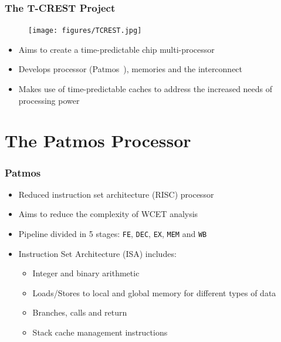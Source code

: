 \documentclass[notheorems]{beamer}
\begin{document}
\begin{frame}
\frametitle{The T-CREST Project}

		\begin{figure}
			\texttt{[image: figures/TCREST.jpg]}
		\end{figure}

\begin{itemize}
	\item Aims to create a time-predictable chip multi-processor
	\item Develops processor (Patmos~\cite{patmos:ppes2011}), memories and the interconnect
	\item Makes use of time-predictable caches to address the increased needs of processing power
\end{itemize}
\end{frame}

\section{The Patmos Processor}
\begin{frame}
\frametitle{Patmos}

\begin{itemize}
	\item Reduced instruction set architecture (RISC) processor
	\item Aims to reduce the complexity of WCET analysis
	\item Pipeline divided in 5 stages: \texttt{FE}, \texttt{DEC}, \texttt{EX}, \texttt{MEM} and \texttt{WB}
	\item Instruction Set Architecture (ISA) includes:
		\begin{itemize}
			\item Integer and binary arithmetic
			\item Loads/Stores to local and global memory for different types of data
			\item Branches, calls and return 
			\item Stack cache management instructions
		\end{itemize}
\end{itemize}
\end{frame}
\end{document}
